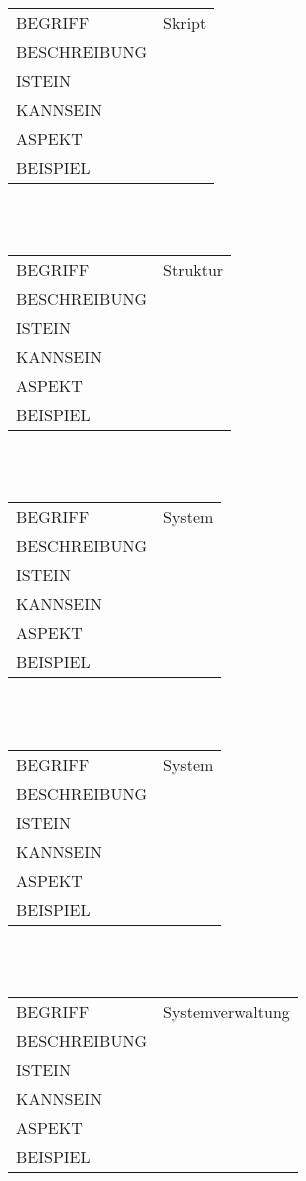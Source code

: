\documentclass[12pt,a4paper]{article}
\begin{document}
\begin{tabular}{l p{10cm}}
BEGRIFF 	 & Skript \\ 
BESCHREIBUNG & \\ 
ISTEIN   	 & \\
KANNSEIN 	 & \\ 
ASPEKT   	 & \\
BEISPIEL 	 & \\
\hline
\end{tabular}\\\\  

\begin{tabular}{l p{10cm}}
BEGRIFF 	 & Struktur \\ 
BESCHREIBUNG & \\ 
ISTEIN   	 & \\
KANNSEIN 	 & \\ 
ASPEKT   	 & \\
BEISPIEL 	 & \\
\hline
\end{tabular}\\\\ 

\begin{tabular}{l p{10cm}} 
BEGRIFF 	 & System \\ 
BESCHREIBUNG & \\ 
ISTEIN   	 & \\
KANNSEIN 	 & \\ 
ASPEKT   	 & \\
BEISPIEL 	 & \\
\hline
\end{tabular}\\\\  

\begin{tabular}{l p{10cm}}
BEGRIFF 	 & System \\ 
BESCHREIBUNG & \\ 
ISTEIN   	 & \\
KANNSEIN 	 & \\ 
ASPEKT   	 & \\
BEISPIEL 	 & \\
\hline
\end{tabular}\\\\  

\begin{tabular}{l p{10cm}}
BEGRIFF 	 & Systemverwaltung \\ 
BESCHREIBUNG & \\ 
ISTEIN   	 & \\
KANNSEIN 	 & \\ 
ASPEKT   	 & \\
BEISPIEL 	 & \\
\hline
\end{tabular}\\\\  
\end{document}
